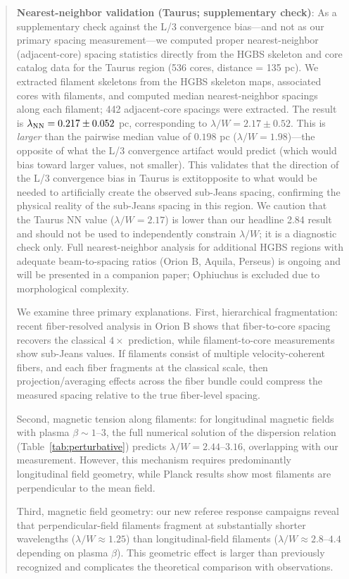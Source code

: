 \documentclass[twoside,twocolumn]{mnras}
\begin{document}
\begin{abstract}
\textbf{Nearest-neighbor validation (Taurus; supplementary check)}: As a supplementary check against the L/3 convergence bias—and not as our primary spacing measurement—we computed proper nearest-neighbor (adjacent-core) spacing statistics directly from the HGBS skeleton and core catalog data for the Taurus region (536 cores, distance = 135 pc). We extracted filament skeletons from the HGBS skeleton maps, associated cores with filaments, and computed median nearest-neighbor spacings along each filament; 442 adjacent-core spacings were extracted. The result is $\lambda_{\rm NN} = 0.217 \pm 0.052$ pc, corresponding to $\lambda/W = 2.17 \pm 0.52$. This is \textit{larger} than the pairwise median value of $0.198$ pc ($\lambda/W = 1.98$)—the opposite of what the L/3 convergence artifact would predict (which would bias toward larger values, not smaller). This validates that the direction of the L/3 convergence bias in Taurus is 	extit{opposite} to what would be needed to artificially create the observed sub-Jeans spacing, confirming the physical reality of the sub-Jeans spacing in this region. We caution that the Taurus NN value ($\lambda/W = 2.17$) is lower than our headline 2.84 result and should not be used to independently constrain $\lambda/W$; it is a diagnostic check only. Full nearest-neighbor analysis for additional HGBS regions with adequate beam-to-spacing ratios (Orion B, Aquila, Perseus) is ongoing and will be presented in a companion paper; Ophiuchus is excluded due to morphological complexity.

We examine three primary explanations. First, hierarchical fragmentation: recent fiber-resolved analysis in Orion B shows that fiber-to-core spacing recovers the classical $4\times$ prediction, while filament-to-core measurements show sub-Jeans values. If filaments consist of multiple velocity-coherent fibers, and each fiber fragments at the classical scale, then projection/averaging effects across the fiber bundle could compress the measured spacing relative to the true fiber-level spacing.

Second, magnetic tension along filaments: for longitudinal magnetic fields with plasma $\beta \sim 1$--$3$, the full numerical solution of the dispersion relation (Table~\ref{tab:perturbative}) predicts $\lambda/W = 2.44$--$3.16$, overlapping with our measurement. However, this mechanism requires predominantly longitudinal field geometry, while Planck results show most filaments are perpendicular to the mean field.

Third, magnetic field geometry: our new referee response campaigns reveal that perpendicular-field filaments fragment at substantially shorter wavelengths ($\lambda/W \approx 1.25$) than longitudinal-field filaments ($\lambda/W \approx 2.8$--$4.4$ depending on plasma $\beta$). This geometric effect is larger than previously recognized and complicates the theoretical comparison with observations.


\end{abstract}
\end{document}
